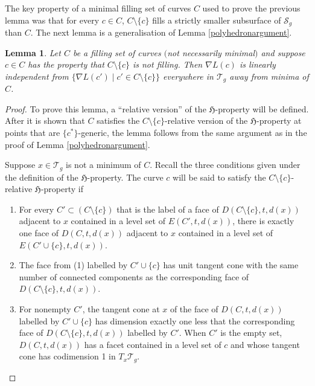\documentclass[11pt]{article}
\numberwithin{equation}{section}
\numberwithin{equation}{section}
\newtheorem{Lemma}[Theorem]{Lemma}
\begin{document}
The key property of a minimal filling set of curves $C$ used to prove the previous lemma was that for every $c\in C$, $C\setminus\{c\}$ fills a strictly smaller subsurface of $\mathcal{S}_{g}$ than $C$. The next lemma is a generalisation of Lemma \ref{polyhedronargument}.

\begin{Lemma}
\label{neededtofill}
Let $C$ be a filling set of curves $($not necessarily minimal$)$ and suppose $c\in C$ has the property that $C\setminus\{c\}$ is not filling. Then $\nabla L(c)$ is linearly independent from $\{\nabla L(c') \mid c'\in C\setminus \{c\}\}$ everywhere in $\mathcal{T}_{g}$ away from minima of $C$.
\end{Lemma}

\begin{proof}
To prove this lemma, a ``relative version'' of the $\mathfrak{H}$-property will be defined. After it is shown that $C$ satisfies the $C\setminus\{c\}$-relative version of the $\mathfrak{H}$-property at points that are $\{c^{*}\}$-generic, the lemma follows from the same argument as in the proof of Lemma \ref{polyhedronargument}.

Suppose $x\in \mathcal{T}_{g}$ is not a minimum of $C$. Recall the three conditions given under the definition of the $\mathfrak{H}$-property. The curve $c$ will be said to satisfy the $C\setminus \{c\}$-relative $\mathfrak{H}$-property if
\begin{enumerate}\itemsep=0pt
\item[(1)] For every $C'\subset (C\setminus \{c\})$ that is the label of a face of $D(C\setminus\{c\},t,d(x))$ adjacent to $x$ contained in a level set of $E(C',t,d(x))$, there is exactly one face of $D(C,t,d(x))$ adjacent to $x$ contained in a level set of $E(C'\cup\{c\},t,d(x))$.
\item[(2)] The face from (1) labelled by $C'\cup\{c\}$ has unit tangent cone with the same number of connected components as the corresponding face of $D(C\setminus\{c\},t,d(x))$.
\item[(3)] For nonempty $C'$, the tangent cone at $x$ of the face of $D(C,t,d(x))$ labelled by $C'\cup \{c\}$ has dimension exactly one less that the corresponding face of $D(C\setminus\{c\},t,d(x))$ labelled by $C'$. When $C'$ is the empty set, $D(C,t,d(x))$ has a facet contained in a level set of $c$ and whose tangent cone has codimension 1 in $T_{x}\mathcal{T}_{g}$.
\end{enumerate}


\end{proof}
\end{document}
